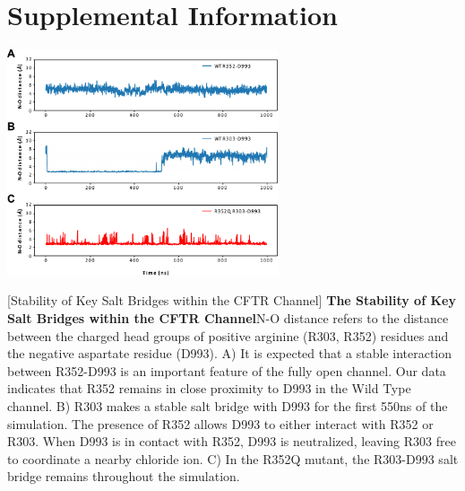 \section{Supplemental Information}
\renewcommand{\thefigure}{\arabic{chapter}.E\arabic{figure}}

\setcounter{figure}{3}

\begin{center}
	\includegraphics[width=0.6\textwidth]{figures/R352Q/R352Q_E4.pdf}
\end{center}
\begingroup
{}[Stability of Key Salt Bridges within the CFTR Channel] {\textbf{The Stability of Key Salt Bridges within the CFTR Channel}}{N-O distance refers to the distance between the charged head groups of positive arginine (R303, R352) residues and the negative aspartate residue (D993). A) It is expected that a stable interaction between R352-D993 is an important feature of the fully open channel. Our data indicates that R352 remains in close proximity to D993 in the Wild Type channel. B) R303 makes a stable salt bridge with D993 for the first 550ns of the simulation. The presence of R352 allows D993 to either interact with R352 or R303. When D993 is in contact with R352, D993 is neutralized, leaving R303 free to coordinate a nearby chloride ion. C) In the R352Q mutant, the R303-D993 salt bridge remains throughout the simulation.}
\label{R352Q_E4}
\endgroup
